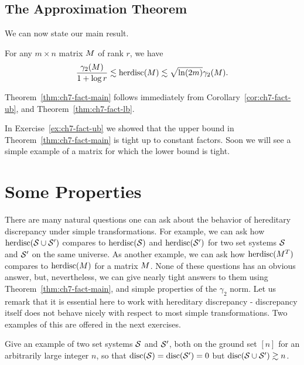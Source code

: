 \subsection{The Approximation Theorem}

We can now state our main result.
\begin{theorem}\label{thm:ch7-fact-main}
  For any $m\times n$ matrix $M$ of rank $r$, we have
  \[
    \frac{\gamma_2(M)}{1 + \log r} \lesssim
    \operatorname{herdisc}(M)
    \lesssim
    \sqrt{\ln(2m)} \gamma_2(M).
  \]
\end{theorem}
Theorem~\ref{thm:ch7-fact-main} follows immediately from
Corollary~\ref{cor:ch7-fact-ub}, and Theorem~\ref{thm:ch7-fact-lb}.

In Exercise~\ref{ex:ch7-fact-ub} we showed that the upper bound in
Theorem~\ref{thm:ch7-fact-main} is tight up to constant factors. Soon
we will see a simple example of a matrix for which the lower bound is
tight.

\section{Some Properties}

There are many natural questions one can ask about the behavior of
hereditary discrepancy under simple transformations. For example, we
can ask how $\operatorname{herdisc}(\mathcal{S} \cup \mathcal{S}')$ compares to $\operatorname{herdisc}(\mathcal{S})$ and
$\operatorname{herdisc}(\mathcal{S}')$ for two set systems $\mathcal{S}$ and $\mathcal{S}'$ on the same
universe. As another example, we can ask how $\operatorname{herdisc}(M^T)$
compares to $\operatorname{herdisc}(M)$ for a matrix $M$. None of these
questions has an obvious answer, but, nevertheless, we can give nearly tight
answers to them using Theorem~\ref{thm:ch7-fact-main}, and simple
properties of the $\gamma_2$ norm. Let us remark that it is essential
here to work with hereditary discrepancy - discrepancy itself does not
behave nicely with respect to most simple transformations. Two
examples of this are offered in the next exercises.

\begin{exercise}
  Give an example of two set systems $\mathcal{S}$ and $\mathcal{S}'$, both on the ground
  set $[n]$ for an arbitrarily large integer $n$, so that $\operatorname{disc}(\mathcal{S})
  = \operatorname{disc}(\mathcal{S}') = 0$ but $\operatorname{disc}(\mathcal{S} \cup \mathcal{S}') \gtrsim n$.
\end{exercise}


